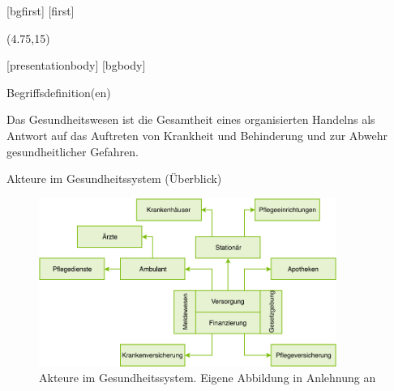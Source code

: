 \documentclass[aspectratio=169,t]{beamer}
\begin{document}
[bgfirst]
[first]
\subtitle{\theslidesection: Kurzer Einblick in das Gesundheitssystem}
\begin{frame}[noframenumbering]
\titlepage
\begin{textblock}{10}(4.75,15)
\cite{GesundheitssystemLogo}
\end{textblock}
\end{frame}
[presentationbody] 
[bgbody]

\begin{frame}{Begriffsdefinition(en)}
    \begin{definition}
        Das Gesundheitswesen ist die Gesamtheit eines organisierten Handelns als Antwort auf das Auftreten von Krankheit und Behinderung und zur Abwehr gesundheitlicher Gefahren.
    \end{definition}
\end{frame}



\begin{frame}{Akteure im Gesundheitssystem (Überblick)}
   \begin{figure}[h!]
    \includegraphics[height=5.5cm]{Bilder/Gesundheitssystem.pdf}
     \caption{Akteure im Gesundheitssystem. Eigene Abbildung in Anlehnung an \cite{SmartHealth}}
   \end{figure}
\end{frame}
\end{document}
